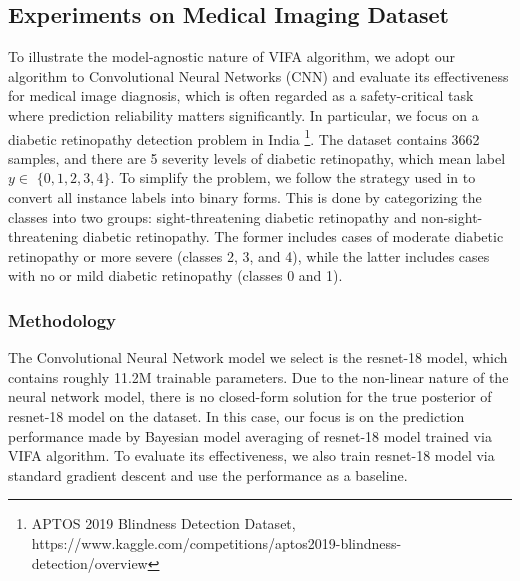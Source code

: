 \documentclass[10pt]{article} %
\begin{document}
\subsection{Experiments on Medical Imaging Dataset}

To illustrate the model-agnostic nature of VIFA algorithm, we adopt our algorithm to Convolutional Neural Networks (CNN) and evaluate its effectiveness for medical image diagnosis, which is often regarded as a safety-critical task where prediction reliability matters significantly. In particular, we focus on a diabetic retinopathy detection problem in India \footnote{APTOS 2019 Blindness Detection Dataset, https://www.kaggle.com/competitions/aptos2019-blindness-detection/overview}. The dataset contains 3662 samples, and there are 5 severity levels of diabetic retinopathy, which mean label $y \in$ $\{0,1,2,3,4\}$. To simplify the problem, we follow the strategy used in \citet{leibig2017leveraging} to convert all instance labels into binary forms. This is done by categorizing the classes into two groups: sight-threatening diabetic retinopathy and non-sight-threatening diabetic retinopathy. The former includes cases of moderate diabetic retinopathy or more severe (classes 2, 3, and 4), while the latter includes cases with no or mild diabetic retinopathy (classes 0 and 1).

\subsubsection{Methodology}

The Convolutional Neural Network model we select is the resnet-18 model, which contains roughly 11.2M trainable parameters. Due to the non-linear nature of the neural network model, there is no closed-form solution for the true posterior of resnet-18 model on the dataset. In this case, our focus is on the prediction performance made by Bayesian model averaging of resnet-18 model trained via VIFA algorithm. To evaluate its effectiveness, we also train resnet-18 model via standard gradient descent and use the performance as a baseline. 
\end{document}

